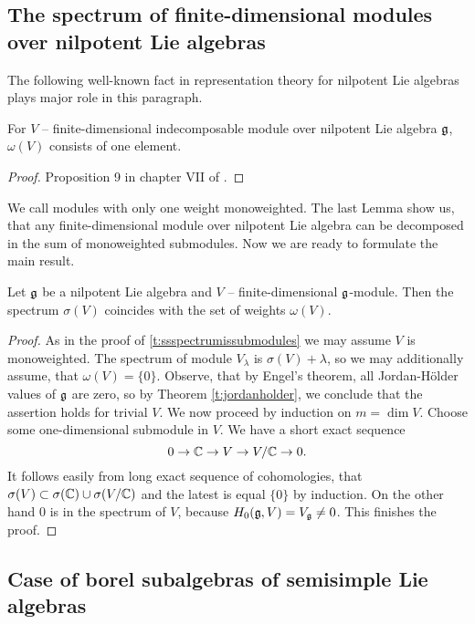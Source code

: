 \subsection{The spectrum of finite-dimensional modules over nilpotent Lie algebras}
The following well-known fact in representation theory for nilpotent Lie algebras plays major role
in this paragraph.
\begin{lemma} \label{l:nilpdecomp}
    For $V$ -- finite-dimensional indecomposable module over nilpotent Lie algebra $\mathfrak{g}$,
    $\omega(V)$ consists of one element.
\end{lemma}
\begin{proof}
    Proposition 9 in chapter VII of \cite{bourbaki}.
\end{proof}
We call modules with only one weight monoweighted. The last Lemma show us, that any
finite-dimensional module over nilpotent Lie algebra can be decomposed in the sum of monoweighted
submodules.  Now we are ready to formulate the main result.
\begin{theorem}
    Let $\mathfrak{g}$ be a nilpotent Lie algebra and $V$ -- finite-dimensional $\mathfrak{g}$-module. Then the
    spectrum $\sigma(V)$ coincides with the set of weights $\omega(V)$.
\end{theorem}
\begin{proof}
    As in the proof of \ref{t:ssspectrumissubmodules} we may assume $V$ is monoweighted. The
    spectrum of module $V_{\lambda}$ is $\sigma(V) + \lambda$, so we may additionally assume, that
    $\omega(V) = \{0\}$. Observe, that by Engel's theorem, all Jordan-H{\"o}lder values of $\mathfrak{g}$
    are zero, so by Theorem \ref{t:jordanholder}, we conclude that the assertion holds for trivial
    $V$. We now proceed by induction on $m = \dim V$. Choose some one-dimensional submodule in $V$.
    We have a short exact sequence
    \[
        0\to \mathbb{C} \to V \to V/\mathbb{C} \to 0.
    \]
    It follows easily from long exact sequence of cohomologies, that $\sigma(V) \subset
    \sigma(\mathbb{C}) \cup \sigma(V/\mathbb{C})$ and the latest is equal $\{0\}$ by induction. On the other hand
    $0$ is in the spectrum of $V$, because $H_0(\mathfrak{g}, V) = V_{\mathfrak{g}} \neq 0$. This finishes the
    proof.
\end{proof}

\subsection{Case of borel subalgebras of semisimple Lie algebras}

